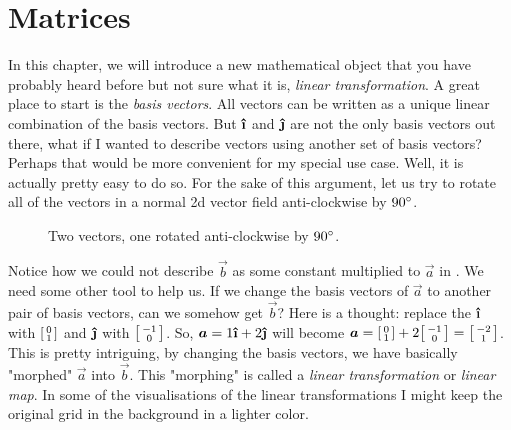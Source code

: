 
\section{Matrices}
In this chapter, we will introduce a new mathematical object that you have probably heard before but not sure what it is, \emph{linear transformation}. A great place to start is the \emph{basis vectors}. All vectors can be written as a unique linear combination of the basis vectors. But \(\ihat\) and \(\jhat\) are not the only basis vectors out there, what if I wanted to describe vectors using another set of basis vectors? Perhaps that would be more convenient for my special use case. Well, it is actually pretty easy to do so. For the sake of this argument, let us try to rotate all of the vectors in a normal 2d vector field anti-clockwise by \(90\degree\). 
\begin{figure}[h]
  \centering
  \caption{Two vectors, one rotated anti-clockwise by \(90\degree\).}
  \label{rotate90}
\end{figure}
Notice how we could not describe \(\vec{b}\) as some constant multiplied to \(\vec{a}\) in . We need some other tool to help us. If we change the basis vectors of \(\vec{a}\) to another pair of basis vectors, can we somehow get \(\vec{b}\)? Here is a thought: replace the \(\ihat\) with \(\begin{bsmallmatrix}
  0 \\
  1
\end{bsmallmatrix}\) and \(\jhat\) with \(\begin{bsmallmatrix}
  -1 \\
  0
\end{bsmallmatrix} \). So, \(\vec{a}=1\ihat+2\jhat\) will become \(\vec{a}=\begin{bsmallmatrix}
  0 \\
  1
\end{bsmallmatrix} + 2\begin{bsmallmatrix}
  -1 \\
  0
\end{bsmallmatrix} = \begin{bsmallmatrix}
  -2 \\
  1
\end{bsmallmatrix} \). This is pretty intriguing, by changing the basis vectors, we have basically "morphed" \(\vec{a}\) into \(\vec{b}\). This "morphing" is called a \emph{linear transformation} or \textit{linear map}. In some of the visualisations of the linear transformations I might keep the original grid in the background in a lighter color.


